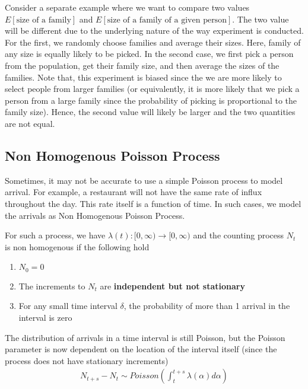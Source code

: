 \documentclass[../../probability-notes.tex]{subfiles}
\begin{document}
    Consider a separate example where we want to compare two values $E[\text{size of a family}]$ and $E[\text{size of a family of a given person}]$.\newline
    The two value will be different due to the underlying nature of the way experiment is conducted. For the first, we randomly choose families and average their sizes. Here, family of any size is equally likely to be picked. In the second case, we first pick a person from the population, get their family size, and then average the sizes of the families. Note that, this experiment is biased since the we are more likely to select people from larger families (or equivalently, it is more likely that we pick a person from a large family since the probability of picking is proportional to the family size). Hence, the second value will likely be larger and the two quantities are not equal.


    \subsection{Non Homogenous Poisson Process}
    Sometimes, it may not be accurate to use a simple Poisson process to model arrival. For example, a restaurant will not have the same rate of influx throughout the day. This rate itself is a function of time. In such cases, we model the arrivals as Non Homogenous Poisson Process.\newline

    For such a process, we have $\lambda(t): [0,\infty) \to [0, \infty)$ and the counting process $N_{t}$ is non homogenous if the following hold
    \begin{enumerate}
        \item $N_{0} = 0$
        \item The increments to $N_{t}$ are \textbf{independent but not stationary}
        \item For any small time interval $\delta$, the probability of more than 1 arrival in the interval is zero
    \end{enumerate}

    The distribution of arrivals in a time interval is still Poisson, but the Poisson parameter is now dependent on the location of the interval itself (since the process does not have stationary increments)
    \begin{align*}
        N_{t+s} - N_{t} \sim Poisson(\int_{t}^{t+s} \lambda(\alpha) d\alpha)
    \end{align*}
\end{document}
